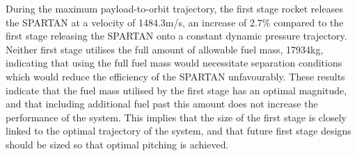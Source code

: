  During the maximum payload-to-orbit trajectory, the first stage rocket releases the SPARTAN at a velocity of 1484.3m/s, an increase of 2.7\% compared to the first stage releasing the SPARTAN onto a constant dynamic pressure trajectory. Neither first stage utilises the full amount of allowable fuel mass, 17934kg, indicating that using the full fuel mass would necessitate separation conditions which would reduce the efficiency of the SPARTAN unfavourably. 
These results indicate that the fuel mass utilised by the first stage has an optimal magnitude, and that including additional fuel past this amount does not increase the performance of the system. This implies that the size of the first stage is closely linked to the optimal trajectory of the system, and that future first stage designs should be sized so that optimal pitching is achieved. 

